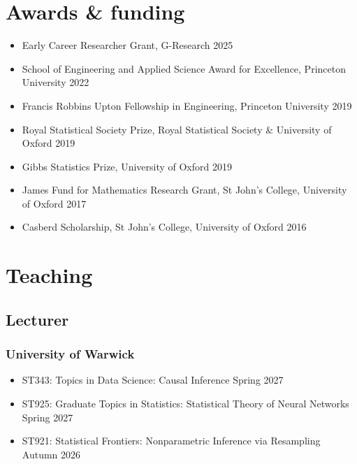 \documentclass{wgu-cv}
\begin{document}
\section{Awards \& funding}
\vspace{-0.2cm}

\begin{itemize}

  \item Early Career Researcher Grant,
    G-Research
    \hfill 2025

  \item School of Engineering and Applied Science Award for Excellence,
    Princeton University
    \hfill 2022

  \item Francis Robbins Upton Fellowship in Engineering,
    Princeton University
    \hfill 2019

  \item Royal Statistical Society Prize,
    Royal Statistical Society \& University of Oxford
    \hfill 2019

  \item Gibbs Statistics Prize,
    University of Oxford
    \hfill 2019

  \item James Fund for Mathematics Research Grant,
    St John's College, University of Oxford
    \hfill 2017

  \item Casberd Scholarship,
    St John's College, University of Oxford
    \hfill 2016

\end{itemize}

\pagebreak

\section{Teaching}

\subsection{Lecturer}{}
\subsubsection{University of Warwick}

\begin{itemize}

  \item
    ST343: Topics in Data Science:
    Causal Inference
    \hfill Spring 2027

  \item
    ST925: Graduate Topics in Statistics:
    Statistical Theory of Neural Networks
    \hfill Spring 2027

  \item
    ST921: Statistical Frontiers:
    Nonparametric Inference via Resampling
    \hfill Autumn 2026

\end{itemize}
\end{document}
